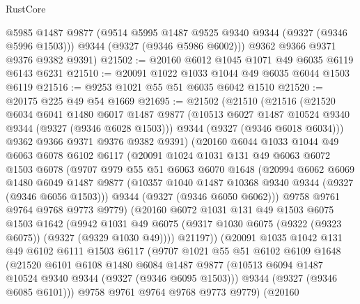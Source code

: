 \begin{lexlean}{RustCore}
\begin{coremodule}
        @5985
        @1487
        @9877
        (@9514 @5995 @1487 @9525 @9340 @9344 (@9327 (@9346 @5996 @1503)))
        @9344
        (@9327 (@9346 @5986 @6002)))
      @9362
      @9366
      @9371
      @9376
      @9382
      @9391)
@21502 := @20160 @6012 @1045 @1071 @49 @6035 @6119 @6143 @6231
@21510 := @20091 @1022 @1033 @1044 @49 @6035 @6044 @1503 @6119
@21516 := @9253 @1021 @55 @51 @6035 @6042 @1510
@21520 := @20175 @225 @49 @54 @1669
@21695 := @21502
    (@21510
      (@21516
        (@21520
          @6034
          @6041
          @1480
          @6017
          @1487
          @9877
          (@10513 @6027 @1487 @10524 @9340 @9344 (@9327 (@9346 @6028 @1503)))
          @9344
          (@9327 (@9346 @6018 @6034)))
        @9362
        @9366
        @9371
        @9376
        @9382
        @9391)
      (@20160
        @6044
        @1033
        @1044
        @49
        @6063
        @6078
        @6102
        @6117
        (@20091
          @1024
          @1031
          @131
          @49
          @6063
          @6072
          @1503
          @6078
          (@9707
            @979
            @55
            @51
            @6063
            @6070
            @1648
            (@20994
              @6062
              @6069
              @1480
              @6049
              @1487
              @9877
              (@10357 @1040 @1487 @10368 @9340 @9344 (@9327 (@9346 @6056 @1503)))
              @9344
              (@9327 (@9346 @6050 @6062)))
            @9758
            @9761
            @9764
            @9768
            @9773
            @9779)
          (@20160
            @6072
            @1031
            @131
            @49
            @1503
            @6075
            @1503
            @1642
            (@9942
              @1031
              @49
              @6075
              (@9317 @1030 @6075 (@9322 (@9323 @6075)) (@9327 (@9329 @1030 @49))))
            @21197))
        (@20091
          @1035
          @1042
          @131
          @49
          @6102
          @6111
          @1503
          @6117
          (@9707
            @1021
            @55
            @51
            @6102
            @6109
            @1648
            (@21520
              @6101
              @6108
              @1480
              @6084
              @1487
              @9877
              (@10513 @6094 @1487 @10524 @9340 @9344 (@9327 (@9346 @6095 @1503)))
              @9344
              (@9327 (@9346 @6085 @6101)))
            @9758
            @9761
            @9764
            @9768
            @9773
            @9779)
          (@20160

\end{coremodule}
\end{lexlean}
